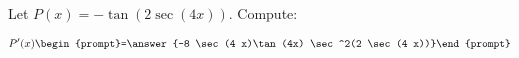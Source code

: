 \documentclass{ximera}
\author{Bart Snapp}
\begin{document}
\begin{exercise}
Let $P(x) = -\tan (2 \sec (4 x))$. Compute:

\[
P'(x)
\begin{prompt}=\answer{-8 \sec (4 x)\tan(4x) \sec ^2(2 \sec (4 x))}\end{prompt}
\]
\end{exercise}
\end{document}
